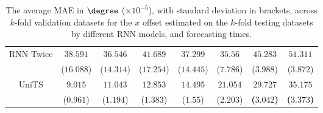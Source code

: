\begin{table}[!ht]
{\begin{tabular}{|c|c|c|c|c|c|c|c|}
			\multirow{2}{*}{RNN Twice} & $38.591$ & $36.546$ & $41.689$ & $37.299$ & $35.56$ & $45.283$ & $51.311$ \\
			 & ($16.088$) & ($14.314$) & ($17.254$) & ($14.445$) & ($7.786$) & ($3.988$) & ($3.872$) \\ \hline
			\multirow{2}{*}{UniTS} & $9.015$ & $11.043$ & $12.853$ & $14.495$ & $21.054$ & $\mathbf{29.727}$ & $\mathbf{35.175}$ \\
			 & ($0.961$) & ($1.194$) & ($1.383$) & ($1.55$) & ($2.203$) & \textbf{(}$\mathbf{3.042}$\textbf{)} & \textbf{(}$\mathbf{3.373}$\textbf{)} \\ \hline
		\end{tabular}
	}
	\caption{The average MAE in $\degree$ ($\times 10^{-5}$), with standard deviation in brackets, across $k$-fold validation datasets for the $x$ offset estimated on the $k$-fold testing datasets by different RNN models, and forecasting times.}
	\label{tab:all_longitude_no_abs_MAE}
\end{table}

